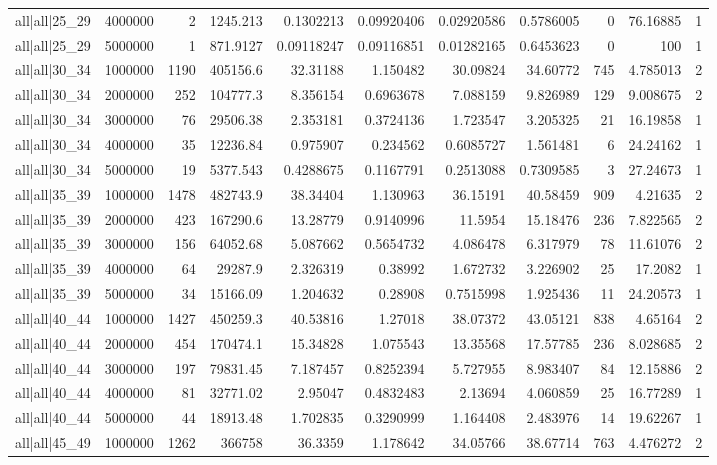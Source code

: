\begin{tabular}{lrrrrrrrrrr}
all|all|25\_29 & 4000000 & 2 & 1245.213 & 0.1302213 & 0.09920406 & 0.02920586 & 0.5786005 & 0 & 76.16885 & 1 \\
all|all|25\_29 & 5000000 & 1 & 871.9127 & 0.09118247 & 0.09116851 & 0.01282165 & 0.6453623 & 0 & 100 & 1 \\
all|all|30\_34 & 1000000 & 1190 & 405156.6 & 32.31188 & 1.150482 & 30.09824 & 34.60772 & 745 & 4.785013 & 2 \\
all|all|30\_34 & 2000000 & 252 & 104777.3 & 8.356154 & 0.6963678 & 7.088159 & 9.826989 & 129 & 9.008675 & 2 \\
all|all|30\_34 & 3000000 & 76 & 29506.38 & 2.353181 & 0.3724136 & 1.723547 & 3.205325 & 21 & 16.19858 & 1 \\
all|all|30\_34 & 4000000 & 35 & 12236.84 & 0.975907 & 0.234562 & 0.6085727 & 1.561481 & 6 & 24.24162 & 1 \\
all|all|30\_34 & 5000000 & 19 & 5377.543 & 0.4288675 & 0.1167791 & 0.2513088 & 0.7309585 & 3 & 27.24673 & 1 \\
all|all|35\_39 & 1000000 & 1478 & 482743.9 & 38.34404 & 1.130963 & 36.15191 & 40.58459 & 909 & 4.21635 & 2 \\
all|all|35\_39 & 2000000 & 423 & 167290.6 & 13.28779 & 0.9140996 & 11.5954 & 15.18476 & 236 & 7.822565 & 2 \\
all|all|35\_39 & 3000000 & 156 & 64052.68 & 5.087662 & 0.5654732 & 4.086478 & 6.317979 & 78 & 11.61076 & 2 \\
all|all|35\_39 & 4000000 & 64 & 29287.9 & 2.326319 & 0.38992 & 1.672732 & 3.226902 & 25 & 17.2082 & 1 \\
all|all|35\_39 & 5000000 & 34 & 15166.09 & 1.204632 & 0.28908 & 0.7515998 & 1.925436 & 11 & 24.20573 & 1 \\
all|all|40\_44 & 1000000 & 1427 & 450259.3 & 40.53816 & 1.27018 & 38.07372 & 43.05121 & 838 & 4.65164 & 2 \\
all|all|40\_44 & 2000000 & 454 & 170474.1 & 15.34828 & 1.075543 & 13.35568 & 17.57785 & 236 & 8.028685 & 2 \\
all|all|40\_44 & 3000000 & 197 & 79831.45 & 7.187457 & 0.8252394 & 5.727955 & 8.983407 & 84 & 12.15886 & 2 \\
all|all|40\_44 & 4000000 & 81 & 32771.02 & 2.95047 & 0.4832483 & 2.13694 & 4.060859 & 25 & 16.77289 & 1 \\
all|all|40\_44 & 5000000 & 44 & 18913.48 & 1.702835 & 0.3290999 & 1.164408 & 2.483976 & 14 & 19.62267 & 1 \\
all|all|45\_49 & 1000000 & 1262 & 366758 & 36.3359 & 1.178642 & 34.05766 & 38.67714 & 763 & 4.476272 & 2 \\

\end{tabular}
